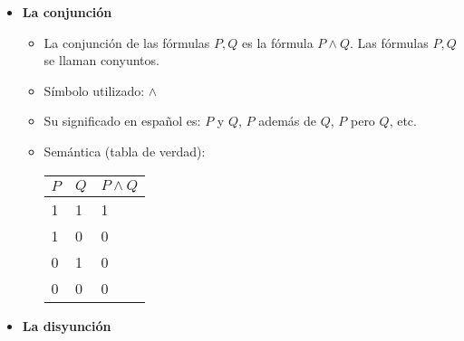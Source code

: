 \documentclass[letterpaper,11pt]{article}
\begin{document}
\begin{enumerate}
\begin{itemize}
\begin{itemize}
                \newpage
                \item \textbf{La conjunción}
                \begin{itemize}
                    \item La conjunción de las fórmulas $P, Q$ es la fórmula 
                    $P \land Q$. Las fórmulas $P, Q$ se llaman conyuntos.
                    \item Símbolo utilizado: $\land$
                    \item Su significado en español es: $P$ y $Q$, $P$ además
                    de $Q$, $P$ pero $Q$, etc.
                    \item Semántica (tabla de verdad):
                    \begin{table}[htbp]
                        \begin{center}
                        \begin{tabular}{|l|l|l|}
                        \hline
                        $P$ & $Q$ & $P \land Q$ \\
                        \hline \hline 
                        1 & 1 & 1 \\ \hline
                        1 & 0 & 0\\ \hline
                        0 & 1 & 0\\ \hline
                        0 & 0 & 0\\  \hline
                        \end{tabular}
                        \end{center}
                    \end{table}
                \end{itemize}
                \item \textbf{La disyunción}
                

\end{itemize}
\end{itemize}
\end{enumerate}
\end{document}

